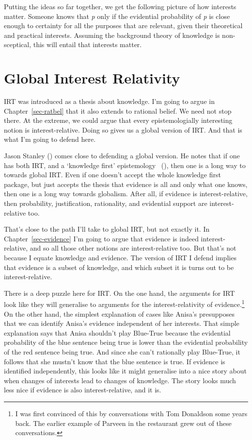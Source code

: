 \documentclass[
  12pt,
  letterpaper,
]{scrbook}
\begin{document}
Putting the ideas so far together, we get the following picture of how
interests matter. Someone knows that \emph{p} only if the evidential
probability of \emph{p} is close enough to certainty for all the
purposes that are relevant, given their theoretical and practical
interests. Assuming the background theory of knowledge is non-sceptical,
this will entail that interests matter.

\section{Global Interest Relativity}\label{sec-global}

IRT was introduced as a thesis about knowledge. I'm going to argue in
Chapter~\ref{sec-ratbel} that it also extends to rational belief. We
need not stop there. At the extreme, we could argue that every
epistemologially interesting notion is interest-relative. Doing so gives
us a global version of IRT. And that is what I'm going to defend here.

Jason Stanley () comes close to
defending a global version. He notes that if one has both IRT, and a
`knowledge first' epistemology
~(), then one is a long
way to towards global IRT. Even if one doesn't accept the whole
knowledge first package, but just accepts the thesis that evidence is
all and only what one knows, then one is a long way towards globalism.
After all, if evidence is interest-relative, then probability,
justification, rationality, and evidential support are interest-relative
too.

That's close to the path I'll take to global IRT, but not exactly it. In
Chapter~\ref{sec-evidence} I'm going to argue that evidence is indeed
interest-relative, and so all those other notions are interest-relative
too. But that's not because I equate knowledge and evidence. The version
of IRT I defend implies that evidence is a subset of knowledge, and
which subset it is turns out to be interest-relative.

There is a deep puzzle here for IRT. On the one hand, the arguments for
IRT look like they will generalise to arguments for the
interest-relativity of evidence.\footnote{I was first convinced of this
  by conversations with Tom Donaldson some years back. The earlier
  example of Parveen in the restaurant grew out of these conversations.}
On the other hand, the simplest explanation of cases like Anisa's
presupposes that we can identify Anisa's evidence independent of her
interests. That simple explanation says that Anisa shouldn't play
Blue-True because the evidential probability of the blue sentence being
true is lower than the evidential probability of the red sentence being
true. And since she can't rationally play Blue-True, it follows that she
mustn't know that the blue sentence is true. If evidence is identified
independently, this looks like it might generalise into a nice story
about when changes of interests lead to changes of knowledge. The story
looks much less nice if evidence is also interest-relative, and it is.
\end{document}
